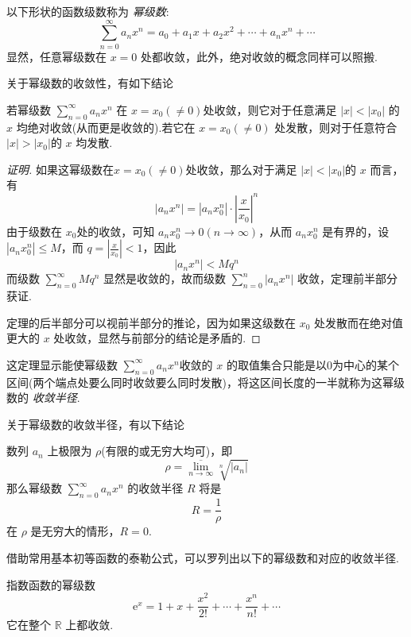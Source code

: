 以下形状的函数级数称为 \emph{幂级数}:
\[ \sum_{n=0}^{\infty} a_nx^n = a_0+a_1x+a_2x^2+\cdots + a_nx^n+\cdots \]
显然，任意幂级数在 $x=0$ 处都收敛，此外，绝对收敛的概念同样可以照搬.

关于幂级数的收敛性，有如下结论
\begin{theorem}
  若幂级数 $\sum_{n=0}^{\infty}a_nx^n$ 在 $x=x_0(\neq 0)$处收敛，则它对于任意满足 $|x|<|x_0|$ 的 $x$ 均绝对收敛(从而更是收敛的).若它在 $x=x_0(\neq 0)$ 处发散，则对于任意符合 $|x|>|x_0|$的 $x$ 均发散.
\end{theorem}

\begin{proof}[证明]
  如果这幂级数在$x=x_0(\neq 0)$处收敛，那么对于满足 $|x|<|x_0|$的 $x$ 而言，有
  \[ |a_nx^n| = |a_nx_0^n| \cdot \left| \frac{x}{x_0} \right|^n \]
  由于级数在 $x_0$处的收敛，可知 $a_nx_0^n \to 0 (n \to \infty)$，从而 $a_nx_0^n$ 是有界的，设 $|a_nx_0^n| \leqslant M$，而 $q=\left| \frac{x}{x_0} \right| < 1$，因此
  \[ |a_nx^n| < Mq^n \]
  而级数 $\sum_{n=0}^{\infty} Mq^n$ 显然是收敛的，故而级数 $\sum_{n=0}^n|a_nx^n|$ 收敛，定理前半部分获证.

  定理的后半部分可以视前半部分的推论，因为如果这级数在 $x_0$ 处发散而在绝对值更大的 $x$ 处收敛，显然与前部分的结论是矛盾的.
\end{proof}

这定理显示能使幂级数 $\sum_{n=0}^{\infty} a_nx^n$收敛的 $x$ 的取值集合只能是以$0$为中心的某个区间(两个端点处要么同时收敛要么同时发散)，将这区间长度的一半就称为这幂级数的 \emph{收敛半径}.

关于幂级数的收敛半径，有以下结论
\begin{theorem}
  数列 ${a_n}$ 上极限为 $\rho$(有限的或无穷大均可)，即
  \[ \rho = \overline{\lim_{n\to\infty}} \sqrt[n]{|a_n|} \]
  那么幂级数 $\sum_{n=0}^{\infty} a_nx^n$ 的收敛半径 $R$ 将是
  \[ R = \frac{1}{\rho} \]
  在 $\rho$ 是无穷大的情形，$R=0$.
\end{theorem}

\begin{example}
  借助常用基本初等函数的泰勒公式，可以罗列出以下的幂级数和对应的收敛半径.

  指数函数的幂级数
  \[ \mathrm{e}^x = 1 + x + \frac{x^2}{2!}+\cdots+\frac{x^n}{n!}+\cdots \]
  它在整个 $\mathbb{R}$ 上都收敛.
\end{example}

